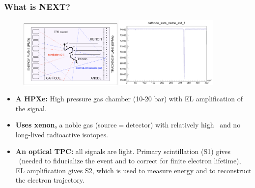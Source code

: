 \begin{frame}
\frametitle{What is NEXT?}

\begin{figure}[tbh!]
  \begin{center}
      \includegraphics[width=0.45\textwidth]{moriond/next_poo.png}
       \includegraphics[width=0.45\textwidth]{moriond/next_s1_s2.png}      
  \end{center}
\end{figure}

\begin{itemize}
\item {\bf A HPXe:} High pressure gas chamber (10-20 bar) with EL amplification of the signal. 
\item {\bf Uses xenon,} a noble gas (source$ = $detector) with relatively high \Qbb\ and no long-lived radioactive isotopes. 
\item {\bf An optical TPC:} all signals are light. Primary scintillation (S1) gives \tz\ (needed to fiducialize the event and to correct for finite electron lifetime), EL amplification gives S2, which is used to measure energy and to reconstruct the electron trajectory. 
\end{itemize}
\end{frame}

